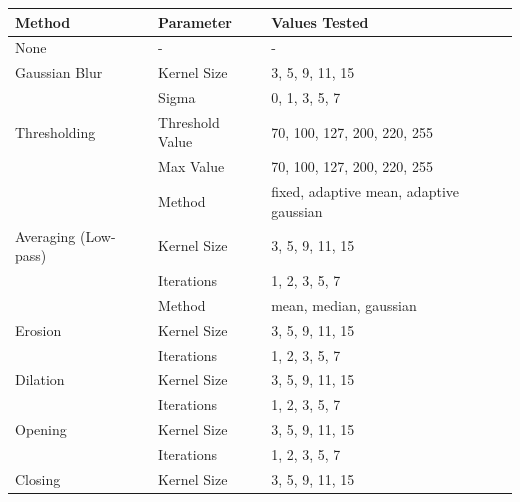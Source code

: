 \documentclass[12pt]{article}
\begin{document}
\renewcommand{\arraystretch}{1.5}
\begin{table}[H]
    \centering
    \small %
    \begin{tabular}{|l|l|l|}
        \hline
        \textbf{Method}      & \textbf{Parameter} & \textbf{Values Tested}                  \\
        \hline
        None
                             & -                  & -                                       \\
        \hline
        Gaussian Blur        & Kernel Size        & 3, 5, 9, 11, 15                         \\
                             & Sigma              & 0, 1, 3, 5, 7                           \\
        \hline
        Thresholding         & Threshold Value    & 70, 100, 127, 200, 220, 255             \\
                             & Max Value          & 70, 100, 127, 200, 220, 255             \\
                             & Method             & fixed, adaptive mean, adaptive gaussian \\
        \hline
        Averaging (Low-pass) & Kernel Size        & 3, 5, 9, 11, 15                         \\
                             & Iterations         & 1, 2, 3, 5, 7                           \\
                             & Method             & mean, median, gaussian                  \\
        \hline
        Erosion              & Kernel Size        & 3, 5, 9, 11, 15                         \\
                             & Iterations         & 1, 2, 3, 5, 7                           \\
        \hline
        Dilation             & Kernel Size        & 3, 5, 9, 11, 15                         \\
                             & Iterations         & 1, 2, 3, 5, 7                           \\
        \hline
        Opening              & Kernel Size        & 3, 5, 9, 11, 15                         \\
                             & Iterations         & 1, 2, 3, 5, 7                           \\
        \hline
        Closing              & Kernel Size        & 3, 5, 9, 11, 15                         \\

\end{tabular}
\end{table}
\end{document}

